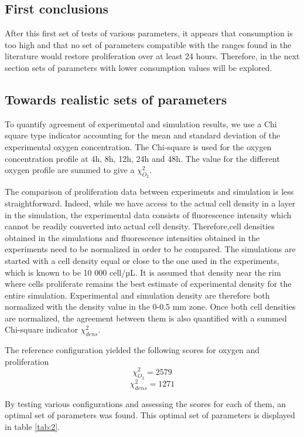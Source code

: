\documentclass[11pt,a4paper]{article}
\begin{document}
\subsection{First conclusions}
After this first set of tests of various parameters, it appears that consumption is too high and that no set of parameters compatible with the  ranges found in the literature would restore proliferation over at least 24 hours. Therefore, in the next section sets of parameters with lower consumption values will be explored.
 
\subsection{Towards realistic sets of parameters}
To quantify agreement of experimental and  simulation results, we use a Chi square type indicator accounting for the mean and standard deviation of the experimental oxygen concentration.\cite{Press1992} The Chi-square is used for the oxygen concentration profile at 4h, 8h, 12h, 24h  and 48h. The value for the different oxygen profile are summed to give a $\chi_{O_2}^2$.

The comparison of proliferation data between experiments and simulation is less straightforward. Indeed, while we have access to the actual cell density in a layer in the simulation, the experimental data consists of fluorescence intensity which cannot be readily converted into actual cell density.  Therefore,cell densities obtained in the simulations and fluorescence intensities obtained in the experiments need to be normalized in order to be compared. The simulations are started with a cell density equal or close to the one used in the experiments, which is known to be 10 000 cell/µL. It is assumed that density near the rim where cells proliferate remains the best estimate of experimental density for the entire simulation. Experimental and simulation density are therefore both normalized with the density value in the 0-0.5 mm zone. Once both cell densities are normalized, the agreement between them is also quantified with a summed Chi-square indicator $\chi_{dens}^2$.

The reference configuration yielded the following scores for oxygen and proliferation
\[ \chi^2_{O_2} = 2579 \]
\[ \chi^2_{dens} =  1271 \]


By testing various configurations and assessing the scores for each of them, an optimal set of parameters was found. This  optimal set of parameters is displayed in table \ref{tab:2}.
\end{document}
